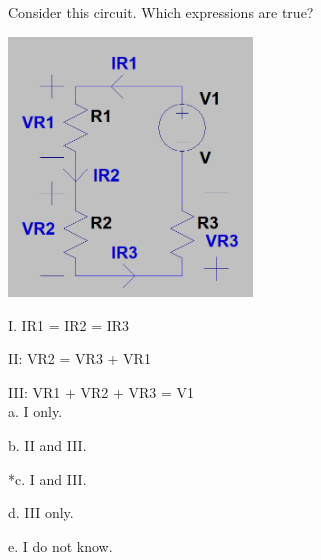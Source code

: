 
Consider this circuit. Which expressions are true?

\includegraphics[width=2.55168in,height=2.71354in]{../../Images/KirchhoffsLawsQ1.png}


I. IR1 = IR2 = IR3

II: VR2 = VR3 + VR1

III: VR1 + VR2 + VR3 = V1\\

a. I only.

b. II and III.

*c. I and III.

d. III only.

e. I do not know.\\
